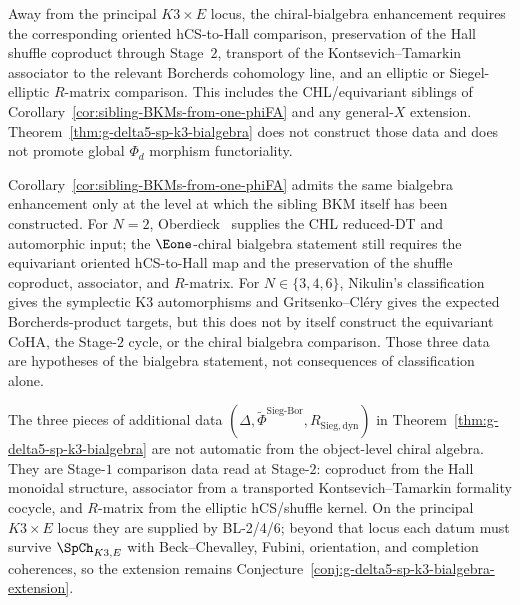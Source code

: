 \begin{conjecture}
\label{conj:g-delta5-sp-k3-bialgebra-extension}
\ClaimStatusConjectured
Away from the principal $K3\times E$ locus, the chiral-bialgebra enhancement requires the corresponding oriented hCS-to-Hall comparison, preservation of the Hall shuffle coproduct through Stage~$2$, transport of the Kontsevich--Tamarkin associator to the relevant Borcherds cohomology line, and an elliptic or Siegel-elliptic $R$-matrix comparison. This includes the CHL/equivariant siblings of Corollary~\ref{cor:sibling-BKMs-from-one-phiFA} and any general-$X$ extension. Theorem~\ref{thm:g-delta5-sp-k3-bialgebra} does not construct those data and does not promote global $\Phi_d$ morphism functoriality.
\end{conjecture}

\begin{remark}
\label{rem:sibling-bialgebra-upgrade}
Corollary~\ref{cor:sibling-BKMs-from-one-phiFA} admits the same bialgebra enhancement only at the level at which the sibling BKM itself has been constructed. For $N = 2$, Oberdieck~\cite{Oberdieck2017} supplies the CHL reduced-DT and automorphic input; the $\Eone$-chiral bialgebra statement still requires the equivariant oriented hCS-to-Hall map and the preservation of the shuffle coproduct, associator, and $R$-matrix. For $N \in \{3, 4, 6\}$, Nikulin's classification gives the symplectic K3 automorphisms and Gritsenko--Cl\'ery gives the expected Borcherds-product targets, but this does not by itself construct the equivariant CoHA, the Stage-$2$ cycle, or the chiral bialgebra comparison. Those three data are hypotheses of the bialgebra statement, not consequences of classification alone.
\end{remark}

\begin{remark}
\label{rem:chiral-bialgebra-stage-tier}
The three pieces of additional data $(\Delta, \widetilde{\Phi}^{\mathrm{Sieg\text{-}Bor}}, R_{\mathrm{Sieg,dyn}})$ in Theorem~\ref{thm:g-delta5-sp-k3-bialgebra} are not automatic from the object-level chiral algebra. They are Stage-$1$ comparison data read at Stage-$2$: coproduct from the Hall monoidal structure, associator from a transported Kontsevich--Tamarkin formality cocycle, and $R$-matrix from the elliptic hCS/shuffle kernel. On the principal $K3\times E$ locus they are supplied by BL-2/4/6; beyond that locus each datum must survive $\SpCh_{K3,E}$ with Beck--Chevalley, Fubini, orientation, and completion coherences, so the extension remains Conjecture~\ref{conj:g-delta5-sp-k3-bialgebra-extension}.
\end{remark}

